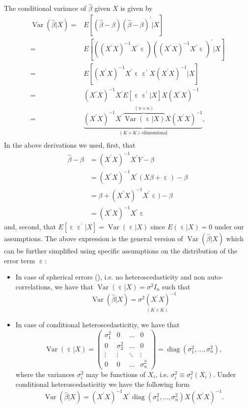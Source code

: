 \documentclass[
  14pt,
]{memoir}
\DeclareMathOperator{\eps}{\varepsilon}
\DeclareMathOperator{\V}{\operatorname{Var}}
\begin{document}
The conditional variance of \(\hat\beta\) given \(X\) is given by
\begin{align*}
\V(\hat{\beta}|X)=& E\left[(\hat{\beta}-\beta)(\hat{\beta}-\beta)^{\prime}|X\right] \\
=& E\left[\left(\left(X^{\prime} X\right)^{-1} X^{\prime} \eps\right)\left(\left(X^{\prime} X\right)^{-1} X^{\prime} \eps\right)^{\prime}|X\right] \\
=& E\left[\left(X^{\prime} X\right)^{-1} X^{\prime} \eps\eps^{\prime} X\left(X^{\prime} X\right)^{-1}|X\right] \\
=& \left(X^{\prime} X\right)^{-1} X^{\prime} E\left[\eps\eps^{\prime}|X\right] X\left(X^{\prime} X\right)^{-1}\\
=& \underbrace{\left(X^{\prime} X\right)^{-1} X^{\prime} \overbrace{\V(\eps|X)}^{(n\times n)} X\left(X^{\prime} X\right)^{-1}}_{(K\times K)\text{-dimesnional}},\\
\end{align*}
In the above derivations we used, first, that
\begin{align*}
\hat\beta-\beta
&=\left(X^{\prime} X\right)^{-1} X^{\prime} Y-\beta\\
&=\left(X^{\prime} X\right)^{-1} X^{\prime}(X\beta+\eps)-\beta\\
&=\beta+\left(X^{\prime} X\right)^{-1} X^{\prime}\eps)-\beta\\
&=\left(X^{\prime} X\right)^{-1} X^{\prime}\eps
\end{align*}
and, second, that \(E\left[\eps\eps^{\prime}|X\right]=\V(\eps|X)\) since \(E(\eps|X)=0\) under our assumptions. The above expression is the general version of \(\V(\hat{\beta}|X)\) which can be further simplified using specific assumptions on the distribution of the error term \(\eps\):

\begin{itemize}
\item In case of spherical errors (), i.e. no heteroscedasticity and non auto-correlations, we have that $\V(\eps|X)=\sigma^2 I_n$ such that
$$
\V(\hat{\beta}|X)=\underset{(K\times K)}{\sigma^{2} \left(X^{\prime} X\right)^{-1}}
$$
\item In case of conditional heteroscedasticitiy, we have that $$\V(\eps|X)=\left(\begin{matrix}\sigma_1^2&0&\dots&0\\0&\sigma_2^2&\dots&0\\\vdots&\vdots&\ddots&\vdots\\0&0&\dots&\sigma_n^2\end{matrix}\right)=\operatorname{diag}(\sigma_1^2,\dots,\sigma_n^2),$$
where the variances $\sigma_i^2$ may be functions of $X_i$, i.e. $\sigma^2_i\equiv\sigma_i^2(X_i)$. 
Under conditional heteroscedasticitiy we have the following  form 
$$
\V(\hat{\beta}|X)=\left(X^{\prime} X\right)^{-1} X^{\prime} \operatorname{diag}(\sigma_1^2,\dots,\sigma_n^2) X\left(X^{\prime} X\right)^{-1}.
$$
\end{itemize}
\end{document}

